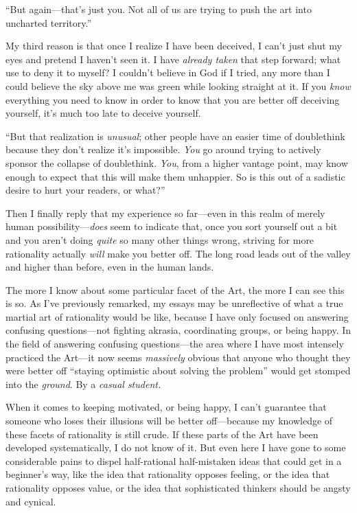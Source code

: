 {
 ``But again---that's just you.
Not all of us are trying to push the art into uncharted
territory.''}

{
 My third reason is that once I realize I have been deceived, I
can't just shut my eyes and pretend I
haven't seen it. I have \textit{already taken} that
step forward; what use to deny it to myself? I couldn't
believe in God if I tried, any more than I could believe the sky above
me was green while looking straight at it. If you \textit{know}
everything you need to know in order to know that you are better off
deceiving yourself, it's much too late to deceive
yourself.}

{
 ``But that realization is \textit{unusual}; other
people have an easier time of doublethink because they
don't realize it's impossible.
\textit{You} go around trying to actively sponsor the collapse of
doublethink. \textit{You}, from a higher vantage point, may know enough
to expect that this will make them unhappier. So is this out of a
sadistic desire to hurt your readers, or what?''}

{
 Then I finally reply that my experience so far---even in this
realm of merely human possibility---\textit{does} seem to indicate
that, once you sort yourself out a bit and you aren't
doing \textit{quite} so many other things wrong, striving for more
rationality actually \textit{will} make you better off. The long road
leads out of the valley and higher than before, even in the human
lands.}

{
 The more I know about some particular facet of the Art, the more I
can see this is so. As I've previously remarked, my
essays may be unreflective of what a true martial art of rationality
would be like, because I have only focused on answering confusing
questions---not fighting akrasia, coordinating groups, or being happy.
In the field of answering confusing questions---the area where I have
most intensely practiced the Art---it now seems \textit{massively}
obvious that anyone who thought they were better off
``staying optimistic about solving the
problem'' would get stomped into the \textit{ground}.
By a \textit{casual student.}}

{
 When it comes to keeping motivated, or being happy, I
can't guarantee that someone who loses their illusions
will be better off---because my knowledge of these facets of
rationality is still crude. If these parts of the Art have been
developed systematically, I do not know of it. But even here I have
gone to some considerable pains to dispel half-rational half-mistaken
ideas that could get in a beginner's way, like the idea
that rationality opposes feeling, or the idea that rationality opposes
value, or the idea that sophisticated thinkers should be angsty and
cynical.}

